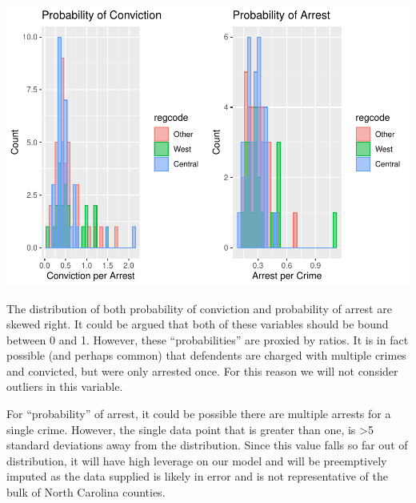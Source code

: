 \documentclass[]{article}
\newenvironment{Shaded}{}{}
\newcommand{\CommentTok}[1]{\textcolor[rgb]{0.00,0.50,0.00}{#1}}
\newcommand{\DecValTok}[1]{#1}
\newcommand{\KeywordTok}[1]{\textcolor[rgb]{0.00,0.00,1.00}{#1}}
\newcommand{\NormalTok}[1]{#1}
\newcommand{\OperatorTok}[1]{#1}
\newcommand{\StringTok}[1]{\textcolor[rgb]{0.00,0.50,0.50}{#1}}
\begin{document}
\includegraphics{Bagnard_Gaustad_Hartman_Leung_Lab_3_files/figure-latex/unnamed-chunk-49-1.pdf}

The distribution of both probability of conviction and probability of
arrest are skewed right. It could be argued that both of these variables
should be bound between 0 and 1. However, these ``probabilities'' are
proxied by ratios. It is in fact possible (and perhaps common) that
defendents are charged with multiple crimes and convicted, but were only
arrested once. For this reason we will not consider outliers in this
variable.

For ``probability'' of arrest, it could be possible there are multiple
arrests for a single crime. However, the single data point that is
greater than one, is \textgreater{}5 standard deviations away from the
distribution. Since this value falls so far out of distribution, it will
have high leverage on our model and will be preemptively imputed as the
data supplied is likely in error and is not representative of the bulk
of North Carolina counties.

\begin{Shaded}
\end{Shaded}
\end{document}
